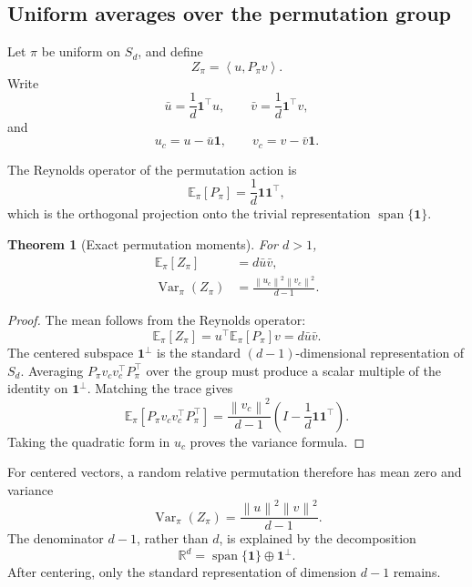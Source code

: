 \documentclass[11pt,a4paper]{article}
\newtheorem{theorem}{Theorem}
\newcommand{\R}{\mathbb{R}}
\newcommand{\Sd}{S_d}
\newcommand{\ip}[2]{\left\langle #1,#2\right\rangle}
\newcommand{\norm}[1]{\left\lVert #1\right\rVert}
\newcommand{\E}{\mathbb{E}}
\newcommand{\Var}{\operatorname{Var}}
\newcommand{\one}{\mathbf{1}}
\begin{document}
\subsection{Uniform averages over the permutation group}

Let $\pi$ be uniform on $\Sd$, and define
\begin{equation}
    Z_\pi=\ip{u}{P_\pi v}.
\end{equation}
Write
\begin{equation}
    \bar u=\frac{1}{d}\one^\top u,
    \qquad
    \bar v=\frac{1}{d}\one^\top v,
\end{equation}
and
\begin{equation}
    u_c=u-\bar u\one,
    \qquad
    v_c=v-\bar v\one.
\end{equation}

The Reynolds operator of the permutation action is
\begin{equation}
    \E_\pi[P_\pi]=\frac{1}{d}\one\one^\top,
\end{equation}
which is the orthogonal projection onto the trivial representation $\operatorname{span}\{\one\}$.

\begin{theorem}[Exact permutation moments]
For $d>1$,
\begin{align}
    \E_\pi[Z_\pi]
    &=d\bar u\bar v, \\
    \Var_\pi(Z_\pi)
    &=\frac{\norm{u_c}^2\norm{v_c}^2}{d-1}.
\end{align}
\end{theorem}

\begin{proof}
The mean follows from the Reynolds operator:
\begin{equation}
\E_\pi[Z_\pi]
=u^\top\E_\pi[P_\pi]v
=d\bar u\bar v.
\end{equation}
The centered subspace $\one^\perp$ is the standard $(d-1)$-dimensional representation of $\Sd$. Averaging $P_\pi v_c v_c^\top P_\pi^\top$ over the group must produce a scalar multiple of the identity on $\one^\perp$. Matching the trace gives
\begin{equation}
    \E_\pi[P_\pi v_c v_c^\top P_\pi^\top]
    =\frac{\norm{v_c}^2}{d-1}
    \left(I-\frac{1}{d}\one\one^\top\right).
\end{equation}
Taking the quadratic form in $u_c$ proves the variance formula.
\end{proof}

For centered vectors, a random relative permutation therefore has mean zero and variance
\begin{equation}
    \Var_\pi(Z_\pi)
    =\frac{\norm{u}^2\norm{v}^2}{d-1}.
\end{equation}
The denominator $d-1$, rather than $d$, is explained by the decomposition
\begin{equation}
    \R^d=\operatorname{span}\{\one\}\oplus\one^\perp.
\end{equation}
After centering, only the standard representation of dimension $d-1$ remains.
\end{document}
